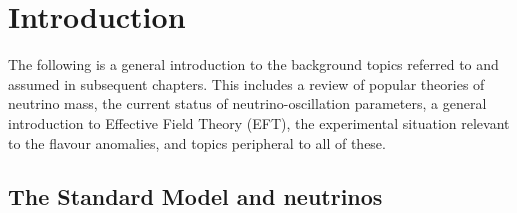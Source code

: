 \graphicspath{{img/chapter_1/}}

\chapter{Introduction}
\label{chapter:introduction}

\begin{synopsis}
  The following is a general introduction to the background topics referred to
  and assumed in subsequent chapters. This includes a review of popular theories
  of neutrino mass, the current status of neutrino-oscillation parameters, a
  general introduction to Effective Field Theory (EFT), the experimental
  situation relevant to the flavour anomalies, and topics peripheral to all of
  these.
\end{synopsis}

\section{The Standard Model and neutrinos}

